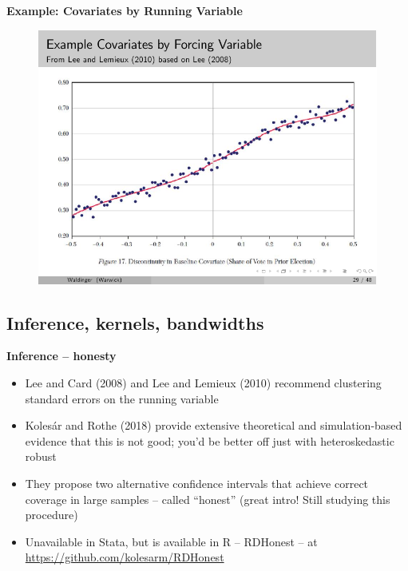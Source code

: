 \documentclass[notes=show]{beamer}
\begin{document}
\begin{frame}[plain]
	\begin{center}
	\textbf{Example: Covariates by Running Variable}
	\end{center}
	
	\begin{figure}
	\includegraphics[scale=0.75]{./lecture_includes/rdd_32.pdf}
	\end{figure}
	
\end{frame}



\subsection{Inference, kernels, bandwidths}

\begin{frame}
\begin{center}
\textbf{Inference -- honesty}
\end{center}

\begin{itemize}
\item Lee and Card (2008) and Lee and Lemieux (2010) recommend clustering standard errors on the running variable 
\item Koles\'ar and Rothe (2018) provide extensive theoretical and simulation-based evidence that this is not good; you'd be better off just with heteroskedastic robust
\item They propose two alternative confidence intervals that achieve correct coverage in large samples -- called ``honest'' (great intro! Still studying this procedure)
\item Unavailable in Stata, but is available in R -- RDHonest -- at \url{https://github.com/kolesarm/RDHonest}
\end{itemize}

\end{frame}
\end{document}
